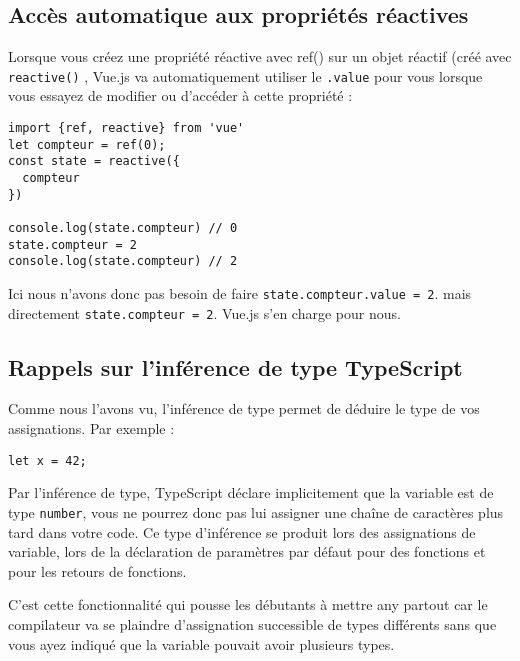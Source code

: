 \subsection{Accès automatique aux propriétés réactives}
Lorsque vous créez une propriété réactive avec {\color{monOrange}ref()} sur un objet réactif (créé avec {\tt reactive()} , {\color{monOrange}Vue.js} va automatiquement utiliser le {\tt .value} pour vous lorsque vous essayez de modifier ou d'accéder à cette propriété :
\begin{verbatim}
import {ref, reactive} from 'vue'
let compteur = ref(0);
const state = reactive({
  compteur
})

console.log(state.compteur) // 0
state.compteur = 2
console.log(state.compteur) // 2
\end{verbatim}
Ici nous n'avons donc pas besoin de faire {\tt state.compteur.value = 2}. mais directement {\tt state.compteur = 2}. {\color{monOrange}Vue.js} s'en charge pour nous.

\subsection{Rappels sur l'inférence de type {\color{monOrange}TypeScript}}
Comme nous l'avons vu, l'inférence de type permet de déduire le type de vos assignations. Par exemple :
\begin{verbatim}
let x = 42;
\end{verbatim}

Par l'inférence de type, {\color{monOrange}TypeScript} déclare implicitement que la variable est de type {\tt number}, vous ne pourrez donc pas lui assigner une chaîne de caractères plus tard dans votre code. Ce type d'inférence se produit lors des assignations de variable, lors de la déclaration de paramètres par défaut pour des fonctions et pour les retours de fonctions.

C'est cette fonctionnalité qui pousse les débutants à mettre {\color{monOrange}any} partout car le compilateur va se plaindre d'assignation successible de types différents sans que vous ayez indiqué que la variable pouvait avoir plusieurs types.


